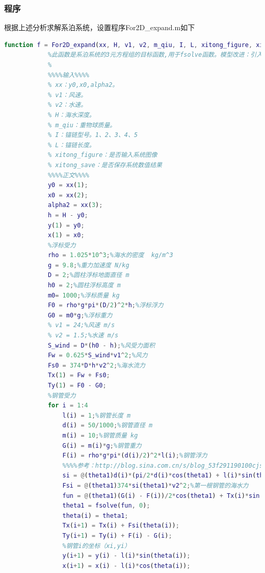         \subsubsection{程序}
            \par
            根据上述分析求解系泊系统，设置程序For2D\_expand.m如下
            \begin{lstlisting}[language = Matlab]
            function f = For2D_expand(xx, H, v1, v2, m_qiu, I, L, xitong_figure, xitong_save)
            %此函数是系泊系统的3元方程组的目标函数,用于fsolve函数。模型改进：引入"力矩平衡"和"悬链线方程"
            %
            %%%%输入%%%%
            % xx：y0,x0,alpha2。
            % v1：风速。
            % v2：水速。
            % H：海水深度。
            % m_qiu：重物球质量。
            % I：锚链型号。1、2、3、4、5
            % L：锚链长度。
            % xitong_figure：是否输入系统图像
            % xitong_save：是否保存系统数值结果
            %%%%正文%%%%
            y0 = xx(1);
            x0 = xx(2);
            alpha2 = xx(3);
            h = H - y0;
            y(1) = y0;
            x(1) = x0;
            %浮标受力
            rho = 1.025*10^3;%海水的密度  kg/m^3
            g = 9.8;%重力加速度 N/kg
            D = 2;%圆柱浮标地面直径 m
            h0 = 2;%圆柱浮标高度 m
            m0= 1000;%浮标质量 kg
            F0 = rho*g*pi*(D/2)^2*h;%浮标浮力
            G0 = m0*g;%浮标重力
            % v1 = 24;%风速 m/s
            % v2 = 1.5;%水速 m/s
            S_wind = D*(h0 - h);%风受力面积
            Fw = 0.625*S_wind*v1^2;%风力
            Fs0 = 374*D*h*v2^2;%海水流力
            Tx(1) = Fw + Fs0;
            Ty(1) = F0 - G0;
            %钢管受力
            for i = 1:4
                l(i) = 1;%钢管长度 m
                d(i) = 50/1000;%钢管直径 m
                m(i) = 10;%钢管质量 kg
                G(i) = m(i)*g;%钢管重力
                F(i) = rho*g*pi*(d(i)/2)^2*l(i);%钢管浮力
                %%%%参考：http://blog.sina.com.cn/s/blog_53f291190100cjss.html
                si = @(theta1)d(i)*(pi/2*d(i)*cos(theta1) + l(i)*sin(theta1));%第一根钢管的海水法平面投影
                Fsi = @(theta1)374*si(theta1)*v2^2;%第一根钢管的海水力
                fun = @(theta1)(G(i) - F(i))/2*cos(theta1) + Tx(i)*sin(theta1) + Fsi(theta1)*sin(theta1)/2 - Ty(i)*cos(theta1);
                theta1 = fsolve(fun, 0);
                theta(i) = theta1;
                Tx(i+1) = Tx(i) + Fsi(theta(i));
                Ty(i+1) = Ty(i) + F(i) - G(i);
                %钢管i的坐标（xi,yi）
                y(i+1) = y(i) - l(i)*sin(theta(i));
                x(i+1) = x(i) - l(i)*cos(theta(i));

\end{lstlisting}
